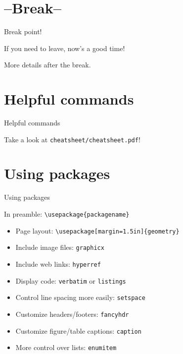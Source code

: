 \documentclass[xcolor={dvipsnames}]{beamer}
\begin{document}
\section{--Break--}
\begin{frame}{Break point!}
\begin{block}{}
\begin{center}
If you need to leave, now's a good time!

More details after the break.
\end{center}
\end{block}
\end{frame}

\section{Helpful commands}
\begin{frame}{Helpful commands}
\begin{block}{}
Take a look at \texttt{cheatsheet/cheatsheet.pdf}!
\end{block}
\end{frame}


\section{Using packages}
\begin{frame}{Using packages}
\begin{block}{}
\centering
In preamble: \texttt{\textbackslash usepackage\{packagename\}}
\end{block}
\begin{itemize}
\item Page layout: \texttt{\textbackslash usepackage[margin=1.5in]\{geometry\}}
\item Include image files: \texttt{graphicx}
\item Include web links: \texttt{hyperref} 
\item Display code: \texttt{verbatim} or \texttt{listings}
\item Control line spacing more easily: \texttt{setspace}
\item Customize headers/footers: \texttt{fancyhdr}
\item Customize figure/table captions: \texttt{caption}
\item More control over lists: \texttt{enumitem}
\end{itemize}
\end{frame}
\end{document}
